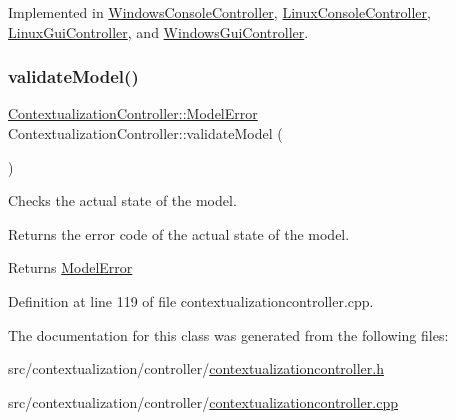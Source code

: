 Implemented in \mbox{\hyperlink{classWindowsConsoleController_ab536d94896c62a1920a6dbfd4b83c18b}{Windows\+Console\+Controller}}, \mbox{\hyperlink{classLinuxConsoleController_ac9944bf1302b077c733802349359e777}{Linux\+Console\+Controller}}, \mbox{\hyperlink{classLinuxGuiController_a8242963a9c5f4b967902f8ee576294ec}{Linux\+Gui\+Controller}}, and \mbox{\hyperlink{classWindowsGuiController_afcda369c002842873b3fb3cc3a593c06}{Windows\+Gui\+Controller}}.

\mbox{\label{classContextualizationController_a6b806979e0b4e5a3ce3af09230f66fef}} 
\subsubsection{\texorpdfstring{validate\+Model()}{validateModel()}}
{\footnotesize\ttfamily \mbox{\hyperlink{classContextualizationController_a78e15dc8f6f1e0cb4df6d86b921be8a4}{Contextualization\+Controller\+::\+Model\+Error}} Contextualization\+Controller\+::validate\+Model (\begin{DoxyParamCaption}{ }\end{DoxyParamCaption})\hspace{0.3cm}{\ttfamily [protected]}}



Checks the actual state of the model. 

Returns the error code of the actual state of the model. \begin{DoxyReturn}{Returns}
\mbox{\hyperlink{classContextualizationController_a78e15dc8f6f1e0cb4df6d86b921be8a4}{Model\+Error}} 
\end{DoxyReturn}


Definition at line 119 of file contextualizationcontroller.\+cpp.



The documentation for this class was generated from the following files\+:\begin{DoxyCompactItemize}
\item 
src/contextualization/controller/\mbox{\hyperlink{contextualizationcontroller_8h}{contextualizationcontroller.\+h}}\item 
src/contextualization/controller/\mbox{\hyperlink{contextualizationcontroller_8cpp}{contextualizationcontroller.\+cpp}}\end{DoxyCompactItemize}
